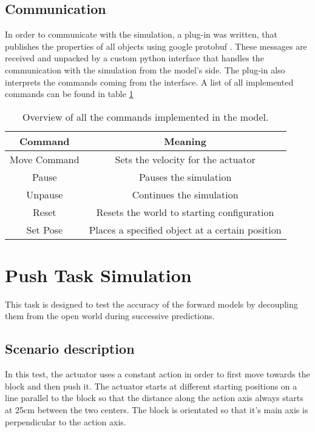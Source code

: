 \subsection{Communication}
In order to communicate with the simulation, a plug-in was written, that publishes the properties of all objects using google protobuf \cite{protobuf}. These messages are received and unpacked by a custom python interface that handles the communication with the simulation from the model's side. The plug-in also interprets the commands coming from the interface. A list of all implemented commands can be found in table \ref{tab:commands}

\begin{table}
	\centering
	\begin{tabular}{|c|c|}
		\hline \textbf{Command} & \textbf{Meaning} \\ 
		\hline Move Command & Sets the velocity for the actuator \\ 
		\hline Pause & Pauses the simulation \\
		\hline Unpause & Continues the simulation \\
		\hline Reset & Resets the world to starting configuration \\
		\hline Set Pose & Places a specified object at a certain position \\
		\hline
	\end{tabular} 
	\caption{Overview of all the commands implemented in the model.}
	\label{tab:commands}
\end{table}

\section{Push Task Simulation}

This task is designed to test the accuracy of the forward models by decoupling them from the open 
world during successive predictions. 

\subsection{Scenario description}

In this test, the actuator uses a constant action in order to first move towards the block and then push it.
The actuator starts at different starting positions on a line parallel to the block so that the distance along
the action axis always starts at 25cm between the two centers. The block is orientated so that it's main axis
is perpendicular to the action axis.

